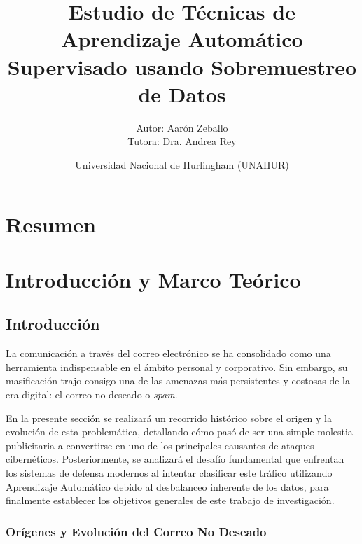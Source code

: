 \documentclass[a4paper,11pt]{book}
\title{Estudio de Técnicas de Aprendizaje Automático
Supervisado usando Sobremuestreo de Datos}
\author{Autor: Aarón Zeballo  \\ Tutora: Dra. Andrea Rey}
\date{Universidad Nacional de Hurlingham (UNAHUR)}
\renewcommand{\listfigurename}{\'Indice de Figuras}
\renewcommand{\listtablename}{\'Indice de Tablas}
\begin{document}
\maketitle


	\tableofcontents
	
	\renewcommand{\listfigurename}{Índice de Figuras}
	\listoffigures
	
    \renewcommand{\listtablename}{Índice de Tablas}
	\listoftables



\chapter*{Resumen}

\noindent



\chapter{Introducción y Marco Teórico}
\label{ch:introducción}

\section{Introducción}

La comunicación a través del correo electrónico se ha consolidado como una herramienta indispensable en el ámbito personal y corporativo. Sin embargo, su masificación trajo consigo una de las amenazas más persistentes y costosas de la era digital: el correo no deseado o \textit{spam}.

En la presente sección se realizará un recorrido histórico sobre el origen y la evolución de esta problemática, detallando cómo pasó de ser una simple molestia publicitaria a convertirse en uno de los principales causantes de ataques cibernéticos. Posteriormente, se analizará el desafío fundamental que enfrentan los sistemas de defensa modernos al intentar clasificar este tráfico utilizando Aprendizaje Automático debido al desbalanceo inherente de los datos, para finalmente establecer los objetivos generales de este trabajo de investigación.

\subsection{Orígenes y Evolución del Correo No Deseado}
\end{document}
